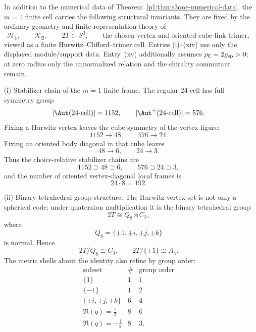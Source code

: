 \documentclass[11pt]{article}
\begin{document}
\begin{theorem}
\label{p1:thm:s3one-structural-invariants}
In addition to the numerical data of
Theorem~\ref{p1:thm:s3one-numerical-data}, the \(m=1\) finite
cell carries the following structural invariants.  They are fixed by the
ordinary geometry and finite representation theory of
\[
    \mathcal H_1,
    \qquad
    \mathcal K_{\mathsf B},
    \qquad
    2T\subset S^3,
    \qquad
    \text{the chosen vertex and oriented cube-link trimer},
\]
viewed as a finite Hurwitz--Clifford--trimer cell.  Entries
\textup{(i)}--\textup{(xiv)} use only the displayed module/support data.
Entry~\textup{(xv)} additionally assumes
\(\rho_{\mathsf C}=2\varrho_{\rm sp}>0\); at zero radius only the
unnormalized relation and the chirality commutant remain.

\smallskip
\noindent\textup{(i) Stabilizer chain of the \(m=1\) finite frame.}
The regular \(24\)-cell has full symmetry group
\[
    |\Aut(24\text{-cell})|=1152,
    \qquad
    |\Aut^+(24\text{-cell})|=576.
\]
Fixing a Hurwitz vertex leaves the cube symmetry of the vertex figure:
\[
    1152\longrightarrow 48,
    \qquad
    576\longrightarrow 24.
\]
Fixing an oriented body diagonal in that cube leaves
\[
    48\longrightarrow 6,
    \qquad
    24\longrightarrow 3.
\]
Thus the choice-relative stabilizer chains are
\[
    1152\supset 48\supset 6,
    \qquad
    576\supset 24\supset 3,
\]
and the number of oriented vertex-diagonal local frames is
\[
    24\cdot 8=192.
\]

\smallskip
\noindent\textup{(ii) Binary tetrahedral group structure.}
The Hurwitz vertex set is not only a spherical code; under quaternion
multiplication it is the binary tetrahedral group
\[
    2T\cong Q_8\rtimes C_3,
\]
where
\[
    Q_8=\{\pm1,\pm i,\pm j,\pm k\}
\]
is normal.  Hence
\[
    2T/Q_8\cong C_3,
    \qquad
    2T/\{\pm1\}\cong A_4.
\]
The metric shells about the identity also refine by group order:
\[
\begin{array}{c|c|c}
\text{subset} & \# & \text{group order}\\
\hline
\{1\} & 1 & 1\\
\{-1\} & 1 & 2\\
\{\pm i,\pm j,\pm k\} & 6 & 4\\
\Re(q)=\tfrac12 & 8 & 6\\
\Re(q)=-\tfrac12 & 8 & 3.
\end{array}
\]


\end{theorem}
\end{document}
